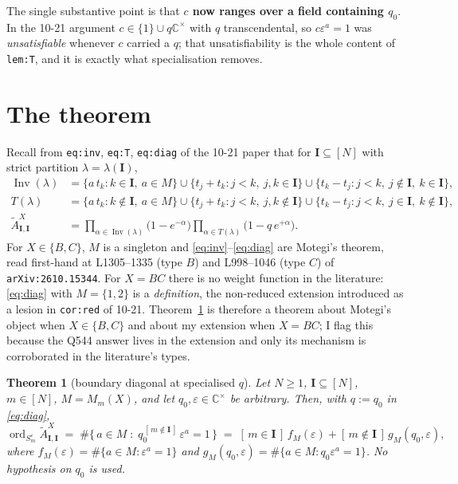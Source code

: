 \documentclass[11pt]{article}
\newtheorem{thm}{Theorem}
\theoremstyle{definition}
\theoremstyle{remark}
\DeclareMathOperator{\Inv}{Inv}
\DeclareMathOperator{\ord}{ord}
\newcommand{\At}{\widetilde{A}}
\newcommand{\bI}{\mathbf{I}}
\begin{document}
The single substantive point is that \textbf{$c$ now ranges over a field containing
$q_0$}.  In the 10-21 argument $c\in\{1\}\cup q\mathbb{C}^{\times}$ with $q$
transcendental, so $c\varepsilon^{a}=1$ was \emph{unsatisfiable} whenever $c$ carried a
$q$; that unsatisfiability is the whole content of \texttt{lem:T}, and it is exactly what
specialisation removes.

\section{The theorem}

Recall from \texttt{eq:inv}, \texttt{eq:T}, \texttt{eq:diag} of the 10-21 paper that for
$\bI\subseteq[N]$ with strict partition $\lambda=\lambda(\bI)$,
\begin{align}
  \Inv(\lambda)&=\{a\,t_k : k\in\bI,\ a\in M\}
   \cup\{t_j+t_k: j<k,\ j,k\in\bI\}
   \cup\{t_k-t_j: j<k,\ j\notin\bI,\ k\in\bI\},
  \label{eq:inv}\\
  T(\lambda)&=\{a\,t_k : k\notin\bI,\ a\in M\}
   \cup\{t_j+t_k: j<k,\ j,k\notin\bI\}
   \cup\{t_k-t_j: j<k,\ j\in\bI,\ k\notin\bI\},
  \label{eq:T}\\
  \At^{X}_{\bI,\bI}
  &=\prod_{\alpha\in\Inv(\lambda)}\bigl(1-e^{-\alpha}\bigr)
   \prod_{\alpha\in T(\lambda)}\bigl(1-q\,e^{+\alpha}\bigr).
  \label{eq:diag}
\end{align}
For $X\in\{B,C\}$, $M$ is a singleton and \eqref{eq:inv}--\eqref{eq:diag} are Motegi's
theorem, read first-hand at L1305--1335 (type $B$) and L998--1046 (type $C$) of
\texttt{arXiv:2610.15344}.  For $X=BC$ there is no weight function in the literature:
\eqref{eq:diag} with $M=\{1,2\}$ is a \emph{definition}, the non-reduced extension
introduced as a lesion in \texttt{cor:red} of 10-21.  Theorem~\ref{thm:main} is therefore
a theorem about Motegi's object when $X\in\{B,C\}$ and about my extension when $X=BC$; I
flag this because the Q544 answer lives in the extension and only its mechanism is
corroborated in the literature's types.

\begin{thm}[boundary diagonal at specialised $q$]\label{thm:main}
Let $N\ge1$, $\bI\subseteq[N]$, $m\in[N]$, $M=M_m(X)$, and let
$q_0,\varepsilon\in\mathbb{C}^{\times}$ be arbitrary.  Then, with $q:=q_0$ in
\eqref{eq:diag},
\begin{equation}
  \ord_{S^{\varepsilon}_m}\At^{X}_{\bI,\bI}
  \;=\;\#\bigl\{\,a\in M \;:\; q_0^{\,[\,m\notin\bI\,]}\,\varepsilon^{a}=1\,\bigr\}
  \;=\;[\,m\in\bI\,]\,f_M(\varepsilon)+[\,m\notin\bI\,]\,g_M(q_0,\varepsilon),
  \label{eq:main}
\end{equation}
where $f_M(\varepsilon)=\#\{a\in M:\varepsilon^{a}=1\}$ and
$g_M(q_0,\varepsilon)=\#\{a\in M: q_0\varepsilon^{a}=1\}$.  No hypothesis on $q_0$ is
used.
\end{thm}
\end{document}
